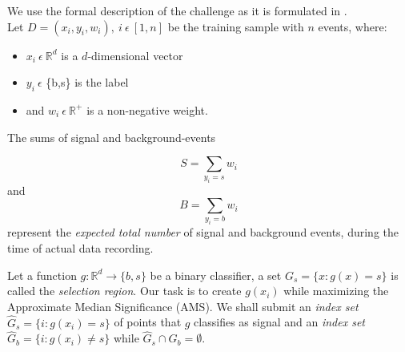 We use the formal description of the challenge as it is formulated in \cite{higgsPaper}.\\
Let $D = {(x_i,y_i,w_i)}, \ i \ \epsilon \ [1,n]$ be the training sample with $n$ events, where:

\begin{itemize}
	\item $x_i \ \epsilon \ \mathbb{R}^{d}$ is a $d$-dimensional vector
	\item $y_i \ \epsilon$ \{b,s\} is the label
	\item and $w_i \ \epsilon \ \mathbb{R}^{+}$ is a non-negative weight.
\end{itemize}

The sums of signal and background-events

$$S = \sum_{y_i = s} w_i$$ and $$B = \sum_{y_i = b} w_i$$ represent the \textit{expected total number} of signal and background events, during the time of actual data recording.

Let a function $g:  \mathbb{R}^{d} \rightarrow \{b,s\}$ be a binary classifier, a set $ G_s = \{x : g(x) = s \} $ is called the \textit{selection region}.
Our task is to create $g(x_i)$ while maximizing the Approximate Median Significance (AMS). We shall submit an \textit{index set} 
$ \hat{G}_s = \{i : g(x_i) = s \} $ of points that $g$ classifies as signal and an \textit{index set} $ \hat{G}_b = \{i : g(x_i) \neq s \} $ while $\hat{G}_s \cap \hat{G}_b = \emptyset$.